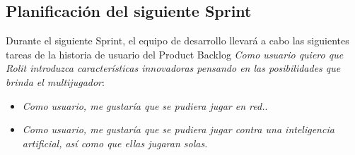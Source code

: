 \documentclass[../../FINAL/Scrum/SCRUM.tex]{subfiles}
\begin{document}
\subsection{Planificación del siguiente Sprint}
Durante el siguiente Sprint, el equipo de desarrollo llevará a cabo las siguientes tareas de la historia de usuario del Product Backlog \textit{Como usuario quiero que Rolit introduzca características innovadoras pensando en las posibilidades que brinda el multijugador}:
\begin{itemize}
\item \textit{Como usuario, me gustaría que se pudiera jugar en red.}.
\item \textit{Como usuario, me gustaría que se pudiera jugar contra una inteligencia artificial, así como que ellas jugaran solas.}
\end{itemize}
\end{document}
